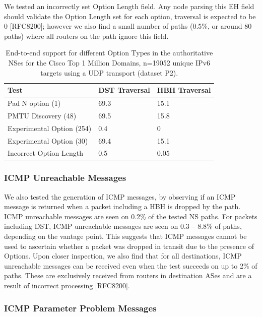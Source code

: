 \documentclass[conference]{IEEEtran}
\begin{document}
We tested an incorrectly set Option Length field. Any node parsing this EH field should validate the Option Length set for each option, traversal is expected to be 0 [RFC8200]; however we also find a small number of paths (0.5\%, or around 80 paths) where all routers on the path ignore this field.

\begin{table}
\begin{tabular}{l|l|l}
Test                      & DST Traversal & HBH Traversal\\
\hline
Pad N option (1)          & 69.3           & 15.1          \\
PMTU Discovery (48)       & 69.5           & 15.8          \\
Experimental Option (254) & 0.4            & 0             \\
Experimental Option (30)  & 69.4           & 15.1          \\
Incorrect Option Length   & 0.5            & 0.05            
\end{tabular}
\label{tbl:option_type_support}
\caption{End-to-end support for different Option Types in the authoritative NSes for the Cisco Top 1 Million Domains, n=19052 unique IPv6 targets using a UDP transport (dataset P2).}
\end{table}

\subsubsection{ICMP Unreachable Messages}

We also tested the generation of
ICMP messages, by observing if an ICMP message is returned when a packet including a HBH is dropped by the path. ICMP unreachable messages are seen on 0.2\% of the tested NS paths. For packets including DST, ICMP unreachable messages are seen on 0.3 – 8.8\% of paths, depending on the vantage point.
This suggests that ICMP messages cannot be used to ascertain whether a packet was dropped in transit due to the presence of Options.
Upon closer inspection, we also find that for all destinations, ICMP unreachable messages can be received even when the test succeeds on up to 2\% of paths. These are exclusively received from routers in destination ASes and are a result of incorrect processing [RFC8200].

\subsubsection{ICMP Parameter Problem Messages}
\end{document}
